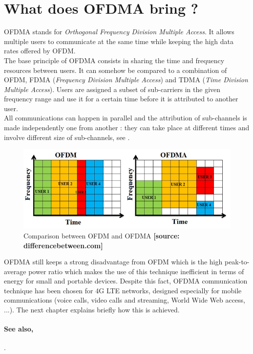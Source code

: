 \section{What does OFDMA bring ?}
%
\indent OFDMA stands for \textit{Orthogonal Frequency Division Multiple Access}. It allows multiple users to communicate at the same time while keeping the high data rates offered by OFDM.\\
%
\indent The base principle of OFDMA consists in sharing the time and frequency resources between users. It can somehow be compared to a combination of OFDM, FDMA (\textit{Frequency Division Multiple Access}) and TDMA (\textit{Time Division Multiple Access})\cite{WikiOFDMA}. Users are assigned a subset of sub-carriers in the given frequency range and use it for a certain time before it is attributed to another user.\\
\indent All communications can happen in parallel and the attribution of sub-channels is made independently one from another : they can take place at different times and involve different size of sub-channels, see .\\
%
\begin{figure}[H]
  \centering
  \includegraphics[width=\textwidth]{figures/difference-between-ofdm-and-ofdma.jpg}
  \caption{Comparison between OFDM and OFDMA \textbf{[source: differencebetween.com]}}
  \label{fig:OFDMvsOFDMA}
\end{figure}
%
\indent OFDMA still keeps a strong disadvantage from OFDM which is the high peak-to-average power ratio which makes the use of this technique inefficient in terms of energy for small and portable devices. Despite this fact, OFDMA communication technique has been chosen for 4G LTE networks, designed especially for mobile communications (voice calls, video calls and streaming, World Wide Web access, ...). The next chapter explains briefly how this is achieved.

\paragraph*{See also,}
\cite[Chap.~19]{AMolisch}.
